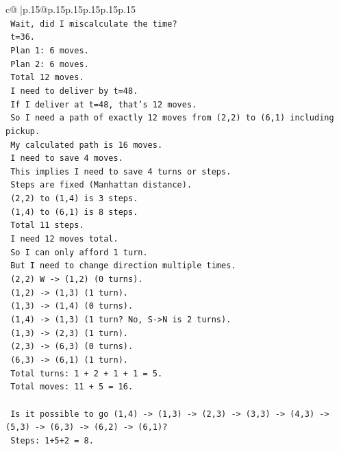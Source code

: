 \documentclass{article}
\begin{document}
{\begin{supertabular}{c@{$\;$}|p{.15\linewidth}@{}p{.15\linewidth}p{.15\linewidth}p{.15\linewidth}p{.15\linewidth}p{.15\linewidth}}
{{{\\ 
\texttt{   Wait, did I miscalculate the time?} \\
\texttt{   t=36.} \\
\texttt{   Plan 1: 6 moves.} \\
\texttt{   Plan 2: 6 moves.} \\
\texttt{   Total 12 moves.} \\
\texttt{   I need to deliver by t=48.} \\
\texttt{   If I deliver at t=48, that's 12 moves.} \\
\texttt{   So I need a path of exactly 12 moves from (2,2) to (6,1) including pickup.} \\
\texttt{   My calculated path is 16 moves.} \\
\texttt{   I need to save 4 moves.} \\
\texttt{   This implies I need to save 4 turns or steps.} \\
\texttt{   Steps are fixed (Manhattan distance).} \\
\texttt{   (2,2) to (1,4) is 3 steps.} \\
\texttt{   (1,4) to (6,1) is 8 steps.} \\
\texttt{   Total 11 steps.} \\
\texttt{   I need 12 moves total.} \\
\texttt{   So I can only afford 1 turn.} \\
\texttt{   But I need to change direction multiple times.} \\
\texttt{   (2,2) W {-}> (1,2) (0 turns).} \\
\texttt{   (1,2) {-}> (1,3) (1 turn).} \\
\texttt{   (1,3) {-}> (1,4) (0 turns).} \\
\texttt{   (1,4) {-}> (1,3) (1 turn? No, S{-}>N is 2 turns).} \\
\texttt{   (1,3) {-}> (2,3) (1 turn).} \\
\texttt{   (2,3) {-}> (6,3) (0 turns).} \\
\texttt{   (6,3) {-}> (6,1) (1 turn).} \\
\texttt{   Total turns: 1 + 2 + 1 + 1 = 5.} \\
\texttt{   Total moves: 11 + 5 = 16.} \\
\\ 
\texttt{   Is it possible to go (1,4) {-}> (1,3) {-}> (2,3) {-}> (3,3) {-}> (4,3) {-}> (5,3) {-}> (6,3) {-}> (6,2) {-}> (6,1)?} \\
\texttt{   Steps: 1+5+2 = 8.} \\
}}}
\end{supertabular}}
\end{document}
